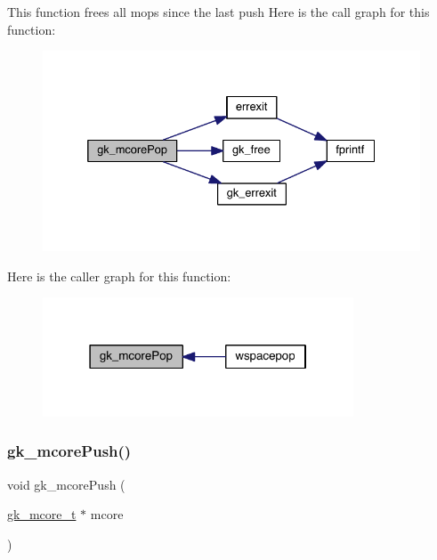 This function frees all mops since the last push Here is the call graph for this function\+:\nopagebreak
\begin{figure}[H]
\begin{center}
\leavevmode
\includegraphics[width=332pt]{a00107_ac7b3189a2be11b6736dc4c27d3d30f3a_cgraph}
\end{center}
\end{figure}
Here is the caller graph for this function\+:\nopagebreak
\begin{figure}[H]
\begin{center}
\leavevmode
\includegraphics[width=262pt]{a00107_ac7b3189a2be11b6736dc4c27d3d30f3a_icgraph}
\end{center}
\end{figure}
\mbox{\label{a00107_a07579694837248c1f2908860edc643c0}} 
\subsubsection{\texorpdfstring{gk\+\_\+mcore\+Push()}{gk\_mcorePush()}}
{\footnotesize\ttfamily void gk\+\_\+mcore\+Push (\begin{DoxyParamCaption}\item[{\hyperlink{a00682}{gk\+\_\+mcore\+\_\+t} $\ast$}]{mcore }\end{DoxyParamCaption})}

